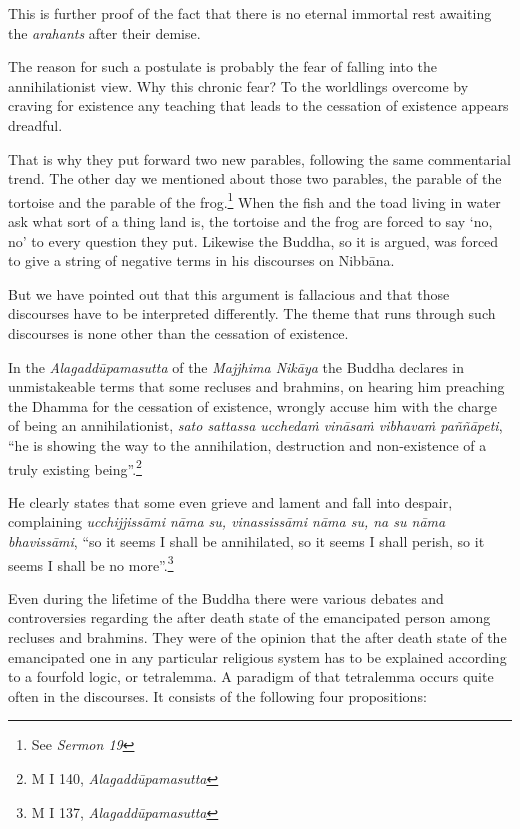 This is further proof of the fact that there is no eternal immortal rest awaiting the \emph{arahants} after their demise.

The reason for such a postulate is probably the fear of falling into the annihilationist view. Why this chronic fear? To the worldlings overcome by craving for existence any teaching that leads to the cessation of existence appears dreadful.

That is why they put forward two new parables, following the same commentarial trend. The other day we mentioned about those two parables, the parable of the tortoise and the parable of the frog.\footnote{See \emph{Sermon 19}} When the fish and the toad living in water ask what sort of a thing land is, the tortoise and the frog are forced to say `no, no' to every question they put. Likewise the Buddha, so it is argued, was forced to give a string of negative terms in his discourses on Nibbāna.

But we have pointed out that this argument is fallacious and that those discourses have to be interpreted differently. The theme that runs through such discourses is none other than the cessation of existence.

In the \emph{Alagaddūpamasutta} of the \emph{Majjhima Nikāya} the Buddha declares in unmistakeable terms that some recluses and brahmins, on hearing him preaching the Dhamma for the cessation of existence, wrongly accuse him with the charge of being an annihilationist, \emph{sato sattassa ucchedaṁ vināsaṁ vibhavaṁ paññāpeti}, ``he is showing the way to the annihilation, destruction and non-existence of a truly existing being''.\footnote{M I 140, \emph{Alagaddūpamasutta}}

He clearly states that some even grieve and lament and fall into despair, complaining \emph{ucchijjissāmi nāma su, vinassissāmi nāma su, na su nāma bhavissāmi}, ``so it seems I shall be annihilated, so it seems I shall perish, so it seems I shall be no more''.\footnote{M I 137, \emph{Alagaddūpamasutta}}

Even during the lifetime of the Buddha there were various debates and controversies regarding the after death state of the emancipated person among recluses and brahmins. They were of the opinion that the after death state of the emancipated one in any particular religious system has to be explained according to a fourfold logic, or tetralemma. A paradigm of that tetralemma occurs quite often in the discourses. It consists of the following four propositions:

